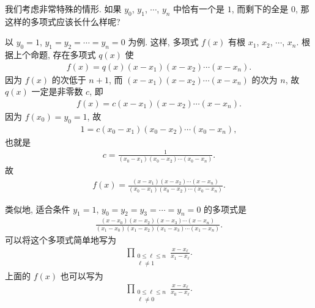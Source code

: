 \begin{example}
    我们考虑非常特殊的情形. 如果 $y_0$, $y_1$, $\cdots$, $y_n$ 中恰有一个是 $1$, 而剩下的全是 $0$, 那这样的多项式应该长什么样呢?

    以 $y_0 = 1$, $y_1 = y_2 = \cdots = y_n = 0$ 为例. 这样, 多项式 $f(x)$ 有根 $x_1$, $x_2$, $\cdots$, $x_n$. 根据上个命题, 存在多项式 $q(x)$ 使
    \begin{align*}
        f(x) = q(x) (x - x_1) (x - x_2) \cdots (x - x_n).
    \end{align*}
    因为 $f(x)$ 的次低于 $n+1$, 而 $(x - x_1) (x - x_2) \cdots (x - x_n)$ 的次为 $n$, 故 $q(x)$ 一定是非零数 $c$, 即
    \begin{align*}
        f(x) = c (x - x_1) (x - x_2) \cdots (x - x_n).
    \end{align*}
    因为 $f(x_0) = y_0 = 1$, 故
    \begin{align*}
        1 = c (x_0 - x_1) (x_0 - x_2) \cdots (x_0 - x_n),
    \end{align*}
    也就是
    \begin{align*}
        c = \frac{1}{(x_0 - x_1) (x_0 - x_2) \cdots (x_0 - x_n)}.
    \end{align*}
    故
    \begin{align*}
        f(x) = \frac{(x - x_1) (x - x_2) \cdots (x - x_n)}{(x_0 - x_1) (x_0 - x_2) \cdots (x_0 - x_n)}.
    \end{align*}

    类似地, 适合条件 $y_1 = 1$, $y_0 = y_2 = y_3 = \cdots = y_n = 0$ 的多项式是
    \begin{align*}
        \frac{(x - x_0)(x - x_2)(x - x_3) \cdots (x - x_n)}{(x_1 - x_0)(x_1 - x_2)(x_1 - x_3) \cdots (x_1 - x_n)}.
    \end{align*}
    可以将这个多项式简单地写为
    \begin{align*}
        \prod_{\begin{smallmatrix}0 \leq \ell \leq n \\\ell \neq 1\end{smallmatrix}} \frac{x - x_\ell}{x_1 - x_\ell}.
    \end{align*}
    上面的 $f(x)$ 也可以写为
    \begin{align*}
        \prod_{\begin{smallmatrix}0 \leq \ell \leq n \\\ell \neq 0\end{smallmatrix}} \frac{x - x_\ell}{x_0 - x_\ell}.
    \end{align*}
\end{example}

